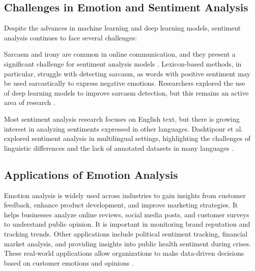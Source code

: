 \subsection{Challenges in Emotion and Sentiment Analysis}

Despite the advances in machine learning and deep learning models, sentiment analysis continues to face several challenges:

Sarcasm and irony are common in online communication, and they present a significant challenge for sentiment analysis models \cite{Meriem2021}. Lexicon-based methods, in particular, struggle with detecting sarcasm, as words with positive sentiment may be used sarcastically to express negative emotions. Researchers explored the use of deep learning models to improve sarcasm detection, but this remains an active area of research \cite{Pozzi2017}.

Most sentiment analysis research focuses on English text, but there is growing interest in analyzing sentiments expressed in other languages. Dashtipour et al. explored sentiment analysis in multilingual settings, highlighting the challenges of linguistic differences and the lack of annotated datasets in many languages \cite{Dashtipour2016}.

\subsection{Applications of Emotion Analysis}

Emotion analysis is widely used across industries to gain insights from customer feedback, enhance product development, and improve marketing strategies. It helps businesses analyze online reviews, social media posts, and customer surveys to understand public opinion. It is important in monitoring brand reputation and tracking trends. Other applications include political sentiment tracking, financial market analysis, and providing insights into public health sentiment during crises. These real-world applications allow organizations to make data-driven decisions based on customer emotions and opinions \cite{nobledesktop2024}.






